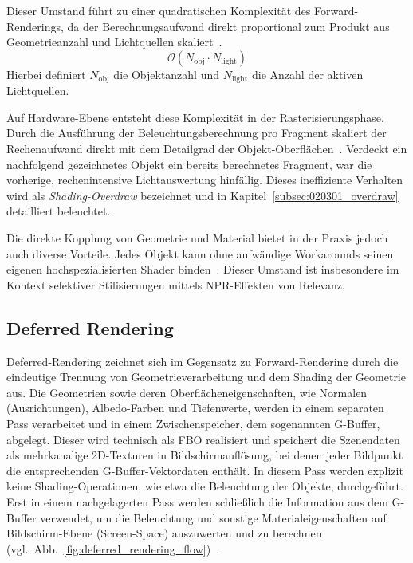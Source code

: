 Dieser Umstand führt zu einer quadratischen Komplexität des Forward-Renderings, da der
Berechnungsaufwand direkt proportional zum Produkt aus Geometrieanzahl und Lichtquellen
skaliert~\parencite[vgl.][Abschn.~1]{Thaler2011DeferredRendering}.
\begin{equation}
    \mathcal{O}(N_{\text{obj}} \cdot N_{\text{light}})
    \label{eq:forward_shading_complexity}
\end{equation}
Hierbei definiert $N_{\text{obj}}$ die Objektanzahl und $N_{\text{light}}$ die Anzahl der aktiven Lichtquellen.

Auf Hardware-Ebene entsteht diese Komplexität in der Rasterisierungsphase.
Durch die Ausführung der Beleuchtungsberechnung pro Fragment skaliert der Rechenaufwand direkt
mit dem Detailgrad der Objekt-Oberflächen~\parencite[vgl.][Abschn.~3.2]{haradaForwardBringingDeferred2012}.
Verdeckt ein nachfolgend gezeichnetes Objekt ein bereits berechnetes Fragment, war die vorherige,
rechenintensive Lichtauswertung hinfällig.
Dieses ineffiziente Verhalten wird als \textit{Shading-Overdraw} bezeichnet und in
Kapitel~\ref{subsec:020301_overdraw} detailliert beleuchtet.

Die direkte Kopplung von Geometrie und Material bietet in der Praxis jedoch auch diverse Vorteile.
Jedes Objekt kann ohne aufwändige Workarounds seinen eigenen hochspezialisierten Shader
binden~\parencite[vgl.][Abschn.~1]{haradaForwardBringingDeferred2012}.
Dieser Umstand ist insbesondere im Kontext selektiver Stilisierungen mittels \ac{NPR}-Effekten von Relevanz.

\subsection{Deferred Rendering}
\label{subsec:020202_deferred_rendering}

Deferred-Rendering zeichnet sich im Gegensatz zu Forward-Rendering durch die eindeutige Trennung von
Geometrieverarbeitung und dem Shading der Geometrie aus.
Die Geometrien sowie deren Oberflächeneigenschaften, wie Normalen (Ausrichtungen), Albedo-Farben
und Tiefenwerte, werden in einem separaten Pass verarbeitet und in einem Zwischenspeicher, dem
sogenannten \ac{G-Buffer}, abgelegt.
Dieser wird technisch als \ac{FBO} realisiert und speichert die Szenendaten als mehrkanalige 2D-Texturen
in Bildschirmauflösung, bei denen jeder Bildpunkt die entsprechenden G-Buffer-Vektordaten enthält.
In diesem Pass werden explizit keine Shading-Operationen, wie etwa die Beleuchtung der Objekte, durchgeführt.
Erst in einem nachgelagerten Pass werden schließlich die Information aus dem \ac{G-Buffer} verwendet, um die
Beleuchtung und sonstige Materialeigenschaften auf Bildschirm-Ebene (Screen-Space) auszuwerten und zu berechnen
(vgl.\ Abb.~\ref{fig:deferred_rendering_flow})~\parencites(vgl.)()[Abschn.~2]{Thaler2011DeferredRendering}
[Kap.~20.1]{akenine-mollerRealtimeRendering2019}
[Folie~\textit{Deferred Rendering}]{valientDeferredRenderingKillzone}.


